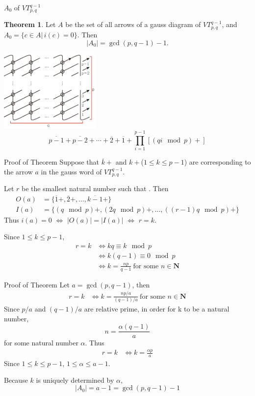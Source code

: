 \documentclass[10pt]{beamer}
\def\vt#1#2#3{VT_{#1,#2}^{#3}}
\theoremstyle{definition}
\newtheorem{thm}{\color{orange}Theorem}[section]
\begin{document}
\begin{frame}[fragile]{$A_0$ of $\vt{p}{q}{q-1}$}
\begin{thm}
Let $A$ be the set of all arrows of a gauss diagram of $\vt{p}{q}{q-1}$,
and $A_0=\{c\in A\vert\, i(c)=0\}$.
Then
\[
|A_0|= \gcd(p,q-1)-1.
\]
\end{thm}

\hfill\includegraphics[height=4cm]{gauss_vt.eps}\hfill
\vspace{-.3cm}
\[
\overline{p-1}+\overline{p-2}+\cdots+\overline{2}+\overline{1}+\prod_{i=1}^{p-1}\left[(qi\mod p)+\right]
\]
\end{frame}


\begin{frame}[fragile]{Proof of Theorem}
Suppose that $\overline{k}+$ and $k+$($1\le k\le p-1$) are corresponding to the arrow $a$
in the gauss word of $\vt{p}{q}{q-1}$.

Let $r$ be the smallest natural number such that .
Then
\begin{align*}
O(a) & = \{\overline{1}+,\overline{2}+,\ldots,\overline{k-1}+\}\\
I(a) & = \{(q\mod p)+, (2q \mod p)+,\ldots,((r-1)q\mod p)+\}
\end{align*}
Thus $i(a)=0$ $\Leftrightarrow$ $|O(a)|=|I(a)|$ $\Leftrightarrow$ $r=k$.

Since $1\le k\le p-1$,
\begin{align*}
r = k & \Leftrightarrow kq \equiv k \mod p\\
& \Leftrightarrow k(q-1)\equiv 0 \mod p\\
& \Leftrightarrow k = \frac{np}{q-1}\ \text{for some $n\in\mathbf{N}$}
\end{align*}
\end{frame}


\begin{frame}[fragile]{Proof of Theorem}
Let $a=\gcd(p,q-1)$, then
\begin{align*}
r = k & \Leftrightarrow k=\frac{np/a}{(q-1)/a}\ \text{for some $n\in\mathbf{N}$}
\end{align*}
Since $p/a$ and $(q-1)/a$ are relative prime, in order for k to be a natural number,
\[
n = \frac{\alpha(q-1)}{a}
\]
for some natural number $\alpha$.
Thus
\begin{align*}
r = k & \Leftrightarrow k=\frac{\alpha p}{a}
\end{align*}
Since $1\le k\le p-1$, $1\le\alpha\le a-1$.

Because $k$ is uniquely determined by $\alpha$,
\[
|A_0| = a-1 = \gcd(p,q-1) - 1\tag*{$\square$}
\]
\end{frame}
\end{document}
